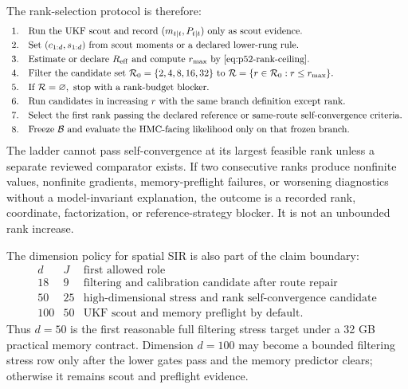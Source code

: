 \documentclass[11pt]{article}
\numberwithin{equation}{section}
\begin{document}
The rank-selection protocol is therefore:
\begin{equation}
\begin{array}{ll}
1. & \text{Run the UKF scout and record }(m_{t|t},P_{t|t})
     \text{ only as scout evidence.}\\[1mm]
2. & \text{Set }(c_{1:d},s_{1:d})\text{ from scout moments or a declared
     lower-rung rule.}\\[1mm]
3. & \text{Estimate or declare }R_{\rm eff}\text{ and compute }r_{\max}
     \text{ by \eqref{eq:p52-rank-ceiling}.}\\[1mm]
4. & \text{Filter the candidate set }
     \mathcal R_0=\{2,4,8,16,32\}
     \text{ to }
     \mathcal R=\{r\in\mathcal R_0:r\le r_{\max}\}.\\[1mm]
5. & \text{If }\mathcal R=\varnothing,\text{ stop with a rank-budget
     blocker.}\\[1mm]
6. & \text{Run candidates in increasing }r\text{ with the same branch
     definition except rank.}\\[1mm]
7. & \text{Select the first rank passing the declared reference or
     same-route self-convergence criteria.}\\[1mm]
8. & \text{Freeze }\mathcal B\text{ and evaluate the HMC-facing likelihood
     only on that frozen branch.}
\end{array}
\label{eq:p52-rank-protocol}
\end{equation}
The ladder cannot pass self-convergence at its largest feasible rank unless a
separate reviewed comparator exists.  If two consecutive ranks produce
nonfinite values, nonfinite gradients, memory-preflight failures, or worsening
diagnostics without a model-invariant explanation, the outcome is a recorded
rank, coordinate, factorization, or reference-strategy blocker.  It is not an
unbounded rank increase.

The dimension policy for spatial SIR is also part of the claim boundary:
\begin{equation}
\begin{array}{c|c|c}
d & J & \text{first allowed role}\\ \hline
18 & 9  & \text{filtering and calibration candidate after route repair}\\
50 & 25 & \text{high-dimensional stress and rank self-convergence candidate}\\
100 & 50 & \text{UKF scout and memory preflight by default.}
\end{array}
\label{eq:p52-dimension-policy}
\end{equation}
Thus \(d=50\) is the first reasonable full filtering stress target under a
32 GB practical memory contract.  Dimension \(d=100\) may become a bounded
filtering stress row only after the lower gates pass and the memory predictor
clears; otherwise it remains scout and preflight evidence.
\end{document}
